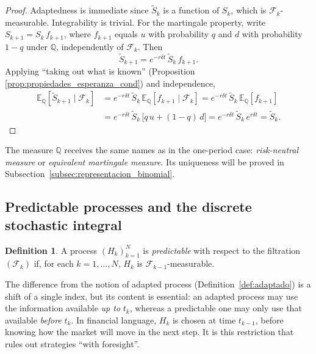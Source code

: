 \documentclass[11pt,a4paper,oneside]{report}
\theoremstyle{plain}
\theoremstyle{definition}
\newtheorem{definicion}[teorema]{Definition}
\theoremstyle{remark}
\newcommand{\E}{\mathbb{E}}
\newcommand{\Q}{\mathbb{Q}}
\newcommand{\F}{\mathcal{F}}
\newcommand{\1}{\mathbf{1}}
\begin{document}
\begin{proof}
Adaptedness is immediate since $\widetilde S_k$ is a function of
$S_k$, which is $\F_k$-measurable. Integrability is trivial. For the
martingale property, write $S_{k+1} = S_k\, f_{k+1}$, where $f_{k+1}$
equals $u$ with probability $q$ and $d$ with probability $1-q$ under
$\Q$, independently of $\F_k$. Then
\begin{equation*}
  \widetilde S_{k+1} = e^{-r \delta t}\, \widetilde S_k\, f_{k+1}.
\end{equation*}
Applying ``taking out what is known'' (Proposition
\ref{prop:propiedades_esperanza_cond}) and independence,
\begin{align*}
  \E_\Q[\widetilde S_{k+1} \mid \F_k]
  &= e^{-r \delta t}\, \widetilde S_k\, \E_\Q[f_{k+1} \mid \F_k]
   = e^{-r \delta t}\, \widetilde S_k\, \E_\Q[f_{k+1}] \\
  &= e^{-r \delta t}\, \widetilde S_k\,\bigl[q\, u + (1 - q)\, d\bigr]
   = e^{-r \delta t}\, \widetilde S_k\, e^{r \delta t}
   = \widetilde S_k.
\end{align*}
\end{proof}

The measure $\Q$ receives the same names as in the one-period case:
\emph{risk-neutral measure} or \emph{equivalent martingale measure}.
Its uniqueness will be proved in
Subsection~\ref{subsec:representacion_binomial}.

\subsection{Predictable processes and the discrete stochastic integral}
\label{subsec:predecibles_int_disc}

\medskip

\begin{definicion}
\label{def:predecible}
A process $(H_k)_{k=1}^{N}$ is \emph{predictable} with respect to the
filtration $(\F_k)$ if, for each $k = 1, \ldots, N$, $H_k$ is
$\F_{k-1}$-measurable.
\end{definicion}

The difference from the notion of adapted process
(Definition~\ref{def:adaptado}) is a shift of a single index, but its
content is essential: an adapted process may use the information
available \emph{up to} $t_k$, whereas a predictable one may only use
that available \emph{before} $t_k$. In financial language, $H_k$ is
chosen at time $t_{k-1}$, before knowing how the market will move in
the next step. It is this restriction that rules out strategies
``with foresight''.
\end{document}
